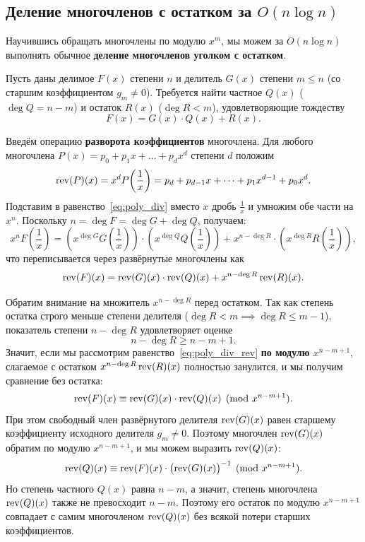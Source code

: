 \subsection{Деление многочленов с остатком за \texorpdfstring{$O(n \log n)$}{O(n log n)}}

Научившись обращать многочлены по модулю $x^m$, мы можем за $O(n \log n)$ выполнять обычное \textbf{деление многочленов уголком с остатком}.

Пусть даны делимое $F(x)$ степени $n$ и делитель $G(x)$ степени $m \le n$ (со старшим коэффициентом $g_m \ne 0$). Требуется найти частное $Q(x)$ ($\deg Q = n - m$) и остаток $R(x)$ ($\deg R < m$), удовлетворяющие тождеству
\begin{equation}\label{eq:poly_div}
    F(x) = G(x) \cdot Q(x) + R(x).
\end{equation}

Введём операцию \textbf{разворота коэффициентов} многочлена. Для любого многочлена $P(x) = p_0 + p_1 x + \dots + p_d x^d$ степени $d$ положим
\[
    \operatorname{rev}(P)(x) = x^d P\!\left(\frac{1}{x}\right) = p_d + p_{d-1} x + \dots + p_1 x^{d-1} + p_0 x^d.
\]
Подставим в равенство~\eqref{eq:poly_div} вместо $x$ дробь $\frac{1}{x}$ и умножим обе части на $x^n$. Поскольку $n = \deg F = \deg G + \deg Q$, получаем:
\[
    x^n F\!\left(\frac{1}{x}\right) = \left(x^{\deg G} G\!\left(\frac{1}{x}\right)\right) \cdot \left(x^{\deg Q} Q\!\left(\frac{1}{x}\right)\right) + x^{n - \deg R} \cdot \left(x^{\deg R} R\!\left(\frac{1}{x}\right)\right),
\]
что переписывается через развёрнутые многочлены как
\begin{equation}\label{eq:poly_div_rev}
    \operatorname{rev}(F)(x) = \operatorname{rev}(G)(x) \cdot \operatorname{rev}(Q)(x) + x^{n - \deg R} \operatorname{rev}(R)(x).
\end{equation}

Обратим внимание на множитель $x^{n - \deg R}$ перед остатком. Так как степень остатка строго меньше степени делителя ($\deg R < m \implies \deg R \le m - 1$), показатель степени $n - \deg R$ удовлетворяет оценке
\[
    n - \deg R \ge n - m + 1.
\]
Значит, если мы рассмотрим равенство~\eqref{eq:poly_div_rev} \textbf{по модулю $x^{n - m + 1}$}, слагаемое с остатком $x^{n - \deg R} \operatorname{rev}(R)(x)$ полностью занулится, и мы получим сравнение без остатка:
\[
    \operatorname{rev}(F)(x) \equiv \operatorname{rev}(G)(x) \cdot \operatorname{rev}(Q)(x) \pmod{x^{n - m + 1}}.
\]
При этом свободный член развёрнутого делителя $\operatorname{rev}(G)(x)$ равен старшему коэффициенту исходного делителя $g_m \ne 0$. Поэтому многочлен $\operatorname{rev}(G)(x)$ обратим по модулю $x^{n - m + 1}$, и мы можем выразить $\operatorname{rev}(Q)(x)$:
\[
    \operatorname{rev}(Q)(x) \equiv \operatorname{rev}(F)(x) \cdot \bigl(\operatorname{rev}(G)(x)\bigr)^{-1} \pmod{x^{n - m + 1}}.
\]
Но степень частного $Q(x)$ равна $n - m$, а значит, степень многочлена $\operatorname{rev}(Q)(x)$ также не превосходит $n - m$. Поэтому его остаток по модулю $x^{n - m + 1}$ совпадает с самим многочленом $\operatorname{rev}(Q)(x)$ без всякой потери старших коэффициентов.

